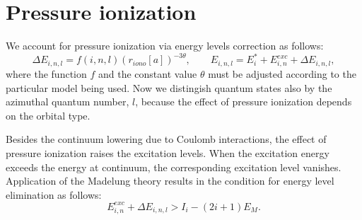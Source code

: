 \section{Pressure ionization}
We account for pressure ionization via energy levels correction as follows:
\begin{equation}
\Delta E_{i,n,l} = f(i,n,l) (r_{iono}[a])^{-3 \theta}, \qquad
E_{i,n,l} = E^*_i + E^{exc}_{i,n} + \Delta E_{i,n,l},
\end{equation}
where the function $f$ and the constant value $\theta$ must be adjusted
according to the particular model being used. Now we distingish quantum states also by
the azimuthal quantum number, $l$, because the effect of pressure ionization
depends on the orbital type.

Besides the continuum lowering due to Coulomb interactions, the effect of
pressure ionization raises the excitation levels. When the excitation energy
exceeds the energy at continuum, the corresponding excitation level vanishes.
Application of the Madelung theory results in the condition for
energy level elimination as follows:
\begin{equation}
E^{exc}_{i,n} + \Delta E_{i,n,l} > I_i - (2i+1) E_M.
\end{equation}

